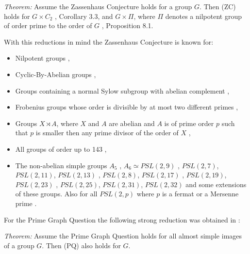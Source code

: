 \documentclass[a4paper,11pt]{report}
\begin{document}
{{ \emph{Theorem:} Assume the Zassenhaus Conjecture holds for a group $G$. Then (ZC) holds for $G \times C_2$ \cite{HoefertKimmerle}, Corollary 3.3, and $G \times \Pi$, where $\Pi$ denotes a nilpotent group of order prime to the order of $G$ \cite{HertweckEdinb}, Proposition 8.1.

 With this reductions in mind the Zassenhaus Conjecture is known for: 
\begin{itemize}
\item  Nilpotent groups \cite{Weiss91}, 
\item  Cyclic-By-Abelian groups \cite{CyclicByAbelian}, 
\item  Groups containing a normal Sylow subgroup with abelian complement \cite{HertweckColloq}, 
\item  Frobenius groups whose order is divisible by at most two different primes \cite{JuriaansMilies}, 
\item  Groups $X \rtimes A$, where $X$ and $A$ are abelian and $A$ is of prime order $p$ such that $p$ is smaller then any prime divisor of the order of $X$ \cite{MRSW}, 
\item  All groups of order up to 143 \cite{BaHeKoMaSi}, 
\item  The non-abelian simple groups $A_5$ \cite{LP}, $A_6 \simeq PSL(2,9)$ \cite{HerA6}, $PSL(2,7)$, $PSL(2,11)$, $PSL(2,13)$ \cite{HertweckBrauer}, $PSL(2,8)$, $PSL(2,17)$ \cite{KonovalovKimmiStAndrews} \cite{Gildea}, $PSL(2,19)$, $PSL(2,23)$ \cite{BaMaM10}, $PSL(2,25)$, $PSL(2,31)$, $PSL(2,32)$ \cite{BaMa4prII} and some extensions of these groups. Also for all $PSL(2,p)$ where $p$ is a fermat or a Mersenne prime \cite{FermatMersenne}. 
\end{itemize}
 For the Prime Graph Question the following strong reduction was obtained in \cite{KonovalovKimmiStAndrews}: 

 \emph{Theorem:} Assume the Prime Graph Question holds for all almost simple images of a group $G$. Then (PQ) also holds for $G.$

}}
\end{document}
